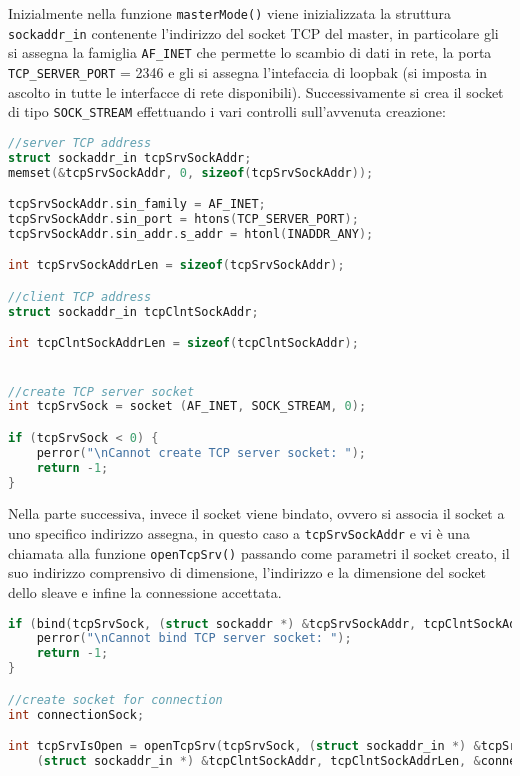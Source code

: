 \documentclass[11pt,fleqn]{book} %
\begin{document}
Inizialmente nella funzione \texttt{masterMode()} viene inizializzata la struttura \texttt{sockaddr\_in} contenente l'indirizzo del socket TCP del master, in particolare gli si assegna la famiglia \texttt{AF\_INET} che permette lo scambio di dati in rete, la porta \texttt{TCP\_SERVER\_PORT} = 2346 e gli si assegna l'intefaccia di loopbak (si imposta in ascolto in tutte le interfacce di rete disponibili).
Successivamente si crea il socket di tipo \texttt{SOCK\_STREAM} effettuando i vari controlli sull'avvenuta creazione:
\begin{lstlisting}[language=C]
//server TCP address
struct sockaddr_in tcpSrvSockAddr;
memset(&tcpSrvSockAddr, 0, sizeof(tcpSrvSockAddr));

tcpSrvSockAddr.sin_family = AF_INET;
tcpSrvSockAddr.sin_port = htons(TCP_SERVER_PORT);
tcpSrvSockAddr.sin_addr.s_addr = htonl(INADDR_ANY);

int tcpSrvSockAddrLen = sizeof(tcpSrvSockAddr);

//client TCP address
struct sockaddr_in tcpClntSockAddr;

int tcpClntSockAddrLen = sizeof(tcpClntSockAddr);


//create TCP server socket
int tcpSrvSock = socket (AF_INET, SOCK_STREAM, 0);

if (tcpSrvSock < 0) {
	perror("\nCannot create TCP server socket: ");
	return -1;
}
\end{lstlisting}

Nella parte successiva, invece il socket viene bindato, ovvero si associa il socket a uno specifico indirizzo assegna, in questo caso a \texttt{tcpSrvSockAddr} e vi è una chiamata alla funzione \texttt{openTcpSrv()} passando come parametri il socket creato, il suo indirizzo comprensivo di dimensione, l'indirizzo e la dimensione del socket dello sleave e infine la connessione accettata.

\begin{lstlisting}[language=C]
if (bind(tcpSrvSock, (struct sockaddr *) &tcpSrvSockAddr, tcpClntSockAddrLen) < 0) {
	perror("\nCannot bind TCP server socket: ");
	return -1;
}

//create socket for connection 
int connectionSock;

int tcpSrvIsOpen = openTcpSrv(tcpSrvSock, (struct sockaddr_in *) &tcpSrvSockAddr, tcpSrvSockAddrLen, 
	(struct sockaddr_in *) &tcpClntSockAddr, tcpClntSockAddrLen, &connectionSock);

\end{lstlisting}
\end{document}
